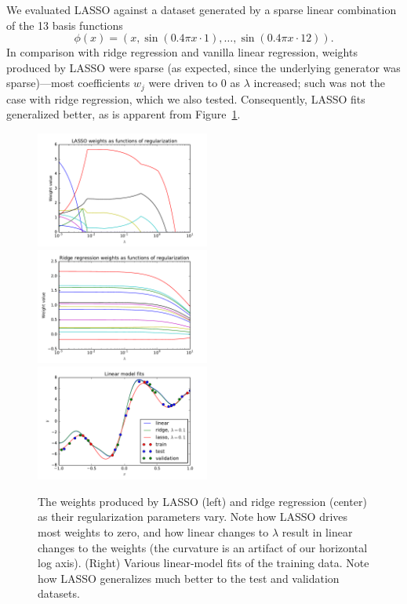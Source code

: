\documentclass{article}
\begin{document}
\begin{multicols}{2}
We evaluated LASSO against a dataset generated by a sparse linear combination of the 13 basis functions
\begin{equation}
\phi(x)=(x, \sin{(0.4\pi x\cdot1)},\dots,\sin({0.4\pi x\cdot 12})).
\end{equation}
In comparison with ridge regression and vanilla linear regression, weights produced by LASSO were sparse (as expected, since the underlying generator was sparse)---most coefficients $w_j$ were driven to 0 as $\lambda$ increased; such was not the case with ridge regression, which we also tested.
Consequently, LASSO fits generalized better, as is apparent from Figure~\ref{fig:lasso-weights}.

\begin{figure}
   \centering
   \includegraphics[width=2.25in]{img/4-1-lasso-weights.pdf}
   \includegraphics[width=2.25in]{img/4-1-ridge-weights.pdf}
   \includegraphics[width=2.25in]{img/4-1-fits.pdf}
   \caption{The weights produced by LASSO (left) and ridge regression (center) as their regularization parameters vary. Note how LASSO drives most weights to zero, and how linear changes to $\lambda$ result in linear changes to the weights (the curvature is an artifact of our horizontal log axis). (Right) Various linear-model fits of the training data. Note how LASSO generalizes much better to the test and validation datasets.}
   \label{fig:lasso-weights}
\end{figure}




\end{multicols}
\end{document}
